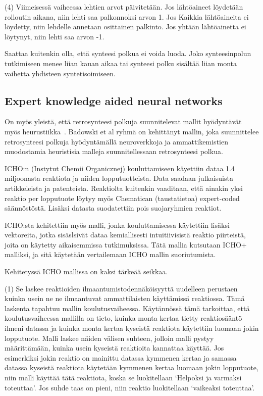 \documentclass[finnish,twoside,censored,tkt,sw-line]{HYthesisML}
\begin{document}
(4) Viimeisessä vaiheessa lehtien arvot päivitetään. Jos lähtöaineet löydetään rolloutin aikana, niin lehti saa
palkonnoksi arvon 1. Jos Kaikkia lähtöaineita ei löydetty, niin lehdelle annetaan osittainen palkinto. Jos yhtään
lähtöainetta ei löytynyt, niin lehti saa arvon -1.

Saattaa kuitenkin olla, että synteesi polkua ei voida luoda. Joko synteesinpolun tutkimiseen menee liian kauan
aikaa tai synteesi polku sisältää liian monta vaihetta yhdisteen syntetisoimiseen.

\subsection{Expert knowledge aided neural networks}

On myös yleistä, että retrosynteesi polkuja  suunnitelevat mallit hyödyntävät myös heurustiikka~\cite{ExpertKnowledgeRetorsynthesis}.
Badowski et al ryhmä on kehittänyt mallin, joka suunnittelee retrosynteesi polkuja hyödyntämällä neuroverkkoja ja ammattikemistien muodostamia heuristisia malleja suunnitellessaan retrosynteesi polkua.

ICHO:n (Instytut Chemii Organicznej) kouluttamiseen käyettiin dataa 1.4 miljoonasta reaktiota ja niiden lopputuotteista.
Data saadaan julkaisuista artikkeleista ja patenteista.
Reaktiolta kuitenkin vaaditaan, että ainakin yksi reaktio per lopputuote löytyy myös Chematican (taustatietoa) expert-coded säännöstöstä.
Lisäksi datasta suodatettiin pois suojaryhmien reaktiot.

ICHO:sta kehitettiin myös malli, jonka kouluttamisessa käytettiin lisäksi vektoreita, jotka sisäslsivät dataa kemiallisesti intuitiivisistä reaktio piirteistä, joita on käytetty aikaisemmissa tutkimuksissa.
Tätä mallia kutsutaan ICHO+ malliksi, ja sitä käytetään vertailemaan ICHO mallin suoriutumista.

Kehitetyssä ICHO mallissa on kaksi tärkeää seikkaa.

(1) Se laskee reaktioiden ilmaantumistodennäköisyyttä uudelleen perustaen kuinka usein ne ne ilmaantuvat ammattilaisten käyttämissä reaktiossa.
Tämä laskenta tapahtuu mallin koulutusvaiheessa.
Käytännössä tämä tarkoittaa, että koulutusvaiheessa mallilla on tieto, kuinka monta kertaa tietty reaktiosääntö ilmeni datassa ja kuinka monta kertaa kyseistä reaktiota käytettiin luomaan jokin lopputuote.
Malli laskee näiden välisen suhteen, jolloin malli pystyy määrittämään, kuinka usein kyseistä reaktioita kannattaa käyttää.
Jos esimerkiksi jokin reaktio on mainittu datassa kymmenen kertaa ja samassa datassa kyseistä reaktiota käytetään kymmenen kertaa luomaan jokin lopputuote, niin malli käyttää tätä reaktiota, koska se luokitellaan `Helpoksi ja varmaksi toteuttaa'.
Jos suhde taas on pieni, niin reaktio luokitellaan `vaikeaksi toteuttaa'.
\end{document}
